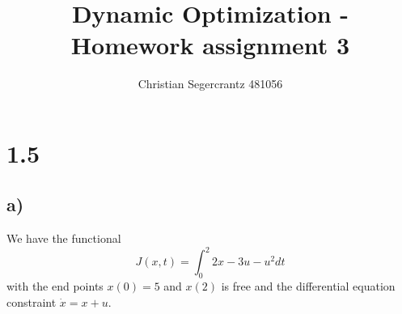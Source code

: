 \documentclass{article}
\title{Dynamic Optimization - Homework assignment 3}
\author{Christian Segercrantz 481056}
\begin{document}
	\maketitle
	\pagebreak

\section*{1.5}
\subsection*{a)}

We have the functional
\begin{equation}
	J(x,t) = \int_{0}^{2} 2x-3u-u^2 dt
\end{equation}
with the end points $x(0) = 5$ and $x(2)$ is free and the differential equation constraint $\dot{x} = x + u$.
\end{document}
